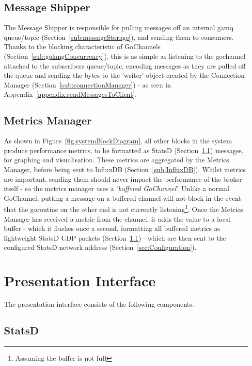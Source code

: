 \subsection{Message Shipper}
\label{sub:Message Shipper}

The Message Shipper is responsible for pulling messages off an internal
\gls{gamq} queue/topic (Section~\ref{sub:messageStorage}), and sending them to
consumers. Thanks to the blocking characteristic of GoChannels
(Section~\ref{sub:golangConcurrency}), this is as simple as listening to the
\gls{gochannel} attached to the subscribers queue/topic, encoding messages as they are
pulled off the queue and sending the bytes to the 'writer' object created by the
Connection Manager (Section~\ref{sub:connectionManager}) - as seen in
Appendix~\ref{appendix:sendMessagesToClient}.

\subsection{Metrics Manager}
\label{sub:Metrics Manager}

As shown in Figure~\ref{fig:systemBlockDiagram}, all other blocks in the system
produce performance metrics, to be formatted as StatsD
(Section~\ref{sub:StatsD}) messages, for graphing and visualisation. These
metrics are aggregated by the Metrics Manager, before being sent to InfluxDB
(Section~\ref{sub:InfluxDB}). Whilst metrics are important, sending them should
never impact the performance of the broker itself - so the metrics manager uses
a '\emph{buffered GoChannel}'\cite{channelsInGo}. Unlike a normal GoChannel,
putting a message on a buffered channel will not block in the event that the
\gls{goroutine} on the other end is not currently listening\footnote{Assuming the
buffer is not full}. Once the Metrics Manager has received a metric from the
channel, it adds the value to a local buffer - which it flushes once a second,
formatting all buffered metrics as lightweight StatsD UDP packets
(Section~\ref{sub:StatsD}) - which are then sent to the configured StatsD
network address (Section~\ref{sec:Configuration}).

\section{Presentation Interface}
\label{sec:presentationInterface}

The presentation interface consists of the following components.

\subsection{StatsD}
\label{sub:StatsD}

